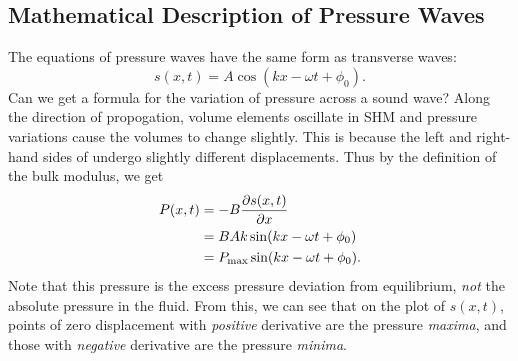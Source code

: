 \documentclass[../classical_mechanics.tex]{subfiles}
\begin{document}
        \subsection{Mathematical Description of Pressure Waves}\label{subsec:mathematical-description-of-pressure-waves}
            The equations of pressure waves have the same form as transverse waves:
            \begin{equation}
                s(x,t)=A\cos(kx-\omega t+\phi_0).
            \end{equation}
            Can we get a formula for the variation of pressure across a sound wave?
            Along the direction of propogation, volume elements oscillate in SHM and pressure variations cause the volumes to change slightly.
            This is because the left and right-hand sides of undergo slightly different displacements.
            Thus by the definition of the bulk modulus, we get
            \begin{align}
                P(x,t)&=-B\pdv{s(x,t)}{x}\\
                &=BAk\sin(kx-\omega t+\phi_0)\\
                &=P_\text{max}\sin(kx-\omega t+\phi_0).
            \end{align}
            Note that this pressure is the excess pressure deviation from equilibrium, \textit{not} the absolute pressure in the fluid.
            From this, we can see that on the plot of $s(x,t)$, points of zero displacement with \textit{positive} derivative are the pressure \textit{maxima}, and those with \textit{negative} derivative are the pressure \textit{minima}.
\end{document}

